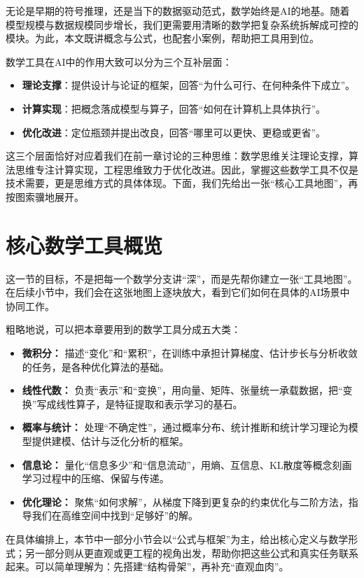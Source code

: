 无论是早期的符号推理，还是当下的数据驱动范式，数学始终是AI的地基。随着模型规模与数据规模同步增长，我们更需要用清晰的数学把复杂系统拆解成可控的模块。为此，本文既讲概念与公式，也配套小案例，帮助把工具用到位。

数学工具在AI中的作用大致可以分为三个互补层面：
\begin{itemize}
\item \textbf{理论支撑}：提供设计与论证的框架，回答“为什么可行、在何种条件下成立”。 
\item \textbf{计算实现}：把概念落成模型与算子，回答“如何在计算机上具体执行”。 
\item \textbf{优化改进}：定位瓶颈并提出改良，回答“哪里可以更快、更稳或更省”。 
\end{itemize}

这三个层面恰好对应着我们在前一章讨论的三种思维：数学思维关注理论支撑，算法思维专注计算实现，工程思维致力于优化改进。因此，掌握这些数学工具不仅是技术需要，更是思维方式的具体体现。下面，我们先给出一张“核心工具地图”，再按图索骥地展开。

\section{核心数学工具概览}

这一节的目标，不是把每一个数学分支讲“深”，而是先帮你建立一张“工具地图”。在后续小节中，我们会在这张地图上逐块放大，看到它们如何在具体的AI场景中协同工作。

粗略地说，可以把本章要用到的数学工具分成五大类：
\begin{itemize}
  \item \textbf{微积分：} 描述“变化”和“累积”，在训练中承担计算梯度、估计步长与分析收敛的任务，是各种优化算法的基础。
  \item \textbf{线性代数：} 负责“表示”和“变换”，用向量、矩阵、张量统一承载数据，把“变换”写成线性算子，是特征提取和表示学习的基石。
  \item \textbf{概率与统计：} 处理“不确定性”，通过概率分布、统计推断和统计学习理论为模型提供建模、估计与泛化分析的框架。
  \item \textbf{信息论：} 量化“信息多少”和“信息流动”，用熵、互信息、KL散度等概念刻画学习过程中的压缩、保留与传递。
  \item \textbf{优化理论：} 聚焦“如何求解”，从梯度下降到更复杂的约束优化与二阶方法，指导我们在高维空间中找到“足够好”的解。
\end{itemize}

在具体编排上，本节中一部分小节会以“公式与框架”为主，给出核心定义与数学形式；另一部分则从更直观或更工程的视角出发，帮助你把这些公式和真实任务联系起来。可以简单理解为：先搭建“结构骨架”，再补充“直观血肉”。


